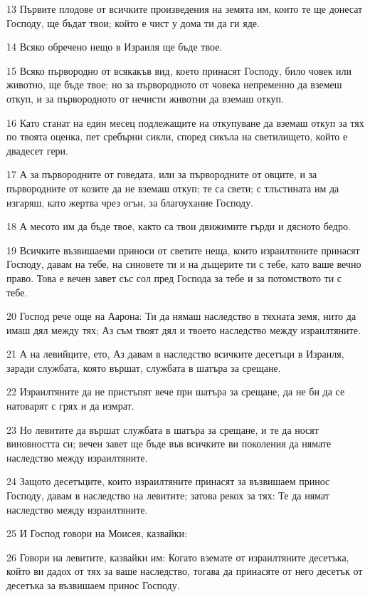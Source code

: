 \par 13 Първите плодове от всичките произведения на земята им, които те ще донесат Господу, ще бъдат твои; който е чист у дома ти да ги яде.
\par 14 Всяко обречено нещо в Израиля ще бъде твое.
\par 15 Всяко първородно от всякакъв вид, което принасят Господу, било човек или животно, ще бъде твое; но за първородното от човека непременно да вземеш откуп, и за първородното от нечисти животни да вземаш откуп.
\par 16 Като станат на един месец подлежащите на откупуване да вземаш откуп за тях по твоята оценка, пет сребърни сикли, според сикъла на светилището, който е двадесет гери.
\par 17 А за първородните от говедата, или за първородните от овците, и за първородните от козите да не вземаш откуп; те са свети; с тлъстината им да изгаряш, като жертва чрез огън, за благоухание Господу.
\par 18 А месото им да бъде твое, както са твои движимите гърди и дясното бедро.
\par 19 Всичките възвишаеми приноси от светите неща, които израилтяните принасят Господу, давам на тебе, на синовете ти и на дъщерите ти с тебе, като ваше вечно право. Това е вечен завет със сол пред Господа за тебе и за потомството ти с тебе.
\par 20 Господ рече още на Аарона: Ти да нямаш наследство в тяхната земя, нито да имаш дял между тях; Аз съм твоят дял и твоето наследство между израилтяните.
\par 21 А на левийците, ето, Аз давам в наследство всичките десетъци в Израиля, заради службата, която вършат, службата в шатъра за срещане.
\par 22 Израилтяните да не пристъпят вече при шатъра за срещане, да не би да се натоварят с грях и да измрат.
\par 23 Но левитите да вършат службата в шатъра за срещане, и те да носят виновността си; вечен завет ще бъде във всичките ви поколения да нямате наследство между израилтяните.
\par 24 Защото десетъците, които израилтяните принасят за възвишаем принос Господу, давам в наследство на левитите; затова рекох за тях: Те да нямат наследство между израилтяните.
\par 25 И Господ говори на Моисея, казвайки:
\par 26 Говори на левитите, казвайки им: Когато вземате от израилтяните десетъка, който ви дадох от тях за ваше наследство, тогава да принасяте от него десетък от десетъка за възвишаем принос Господу.
